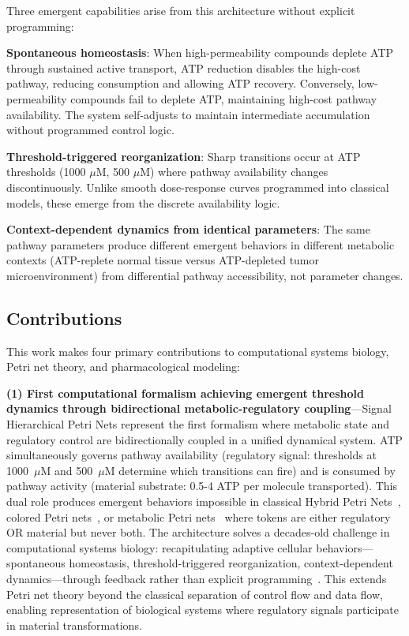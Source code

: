 \documentclass[10pt,letterpaper]{article}
\begin{document}
Three emergent capabilities arise from this architecture without explicit programming:

\textbf{Spontaneous homeostasis}: When high-permeability compounds deplete ATP through sustained active transport, ATP reduction disables the high-cost pathway, reducing consumption and allowing ATP recovery. Conversely, low-permeability compounds fail to deplete ATP, maintaining high-cost pathway availability. The system self-adjusts to maintain intermediate accumulation without programmed control logic.

\textbf{Threshold-triggered reorganization}: Sharp transitions occur at ATP thresholds (1000 $\mu$M, 500 $\mu$M) where pathway availability changes discontinuously. Unlike smooth dose-response curves programmed into classical models, these emerge from the discrete availability logic.

\textbf{Context-dependent dynamics from identical parameters}: The same pathway parameters produce different emergent behaviors in different metabolic contexts (ATP-replete normal tissue versus ATP-depleted tumor microenvironment) from differential pathway accessibility, not parameter changes.

\subsection{Contributions}

This work makes four primary contributions to computational systems biology, Petri net theory, and pharmacological modeling:

\textbf{(1) First computational formalism achieving emergent threshold dynamics through bidirectional metabolic-regulatory coupling}---Signal Hierarchical Petri Nets represent the first formalism where metabolic state and regulatory control are bidirectionally coupled in a unified dynamical system. ATP simultaneously governs pathway availability (regulatory signal: thresholds at 1000~$\mu$M and 500~$\mu$M determine which transitions can fire) and is consumed by pathway activity (material substrate: 0.5-4 ATP per molecule transported). This dual role produces emergent behaviors impossible in classical Hybrid Petri Nets~\cite{David1992}, colored Petri nets~\cite{Jensen1997}, or metabolic Petri nets~\cite{Koch2011} where tokens are either regulatory OR material but never both. The architecture solves a decades-old challenge in computational systems biology: recapitulating adaptive cellular behaviors—spontaneous homeostasis, threshold-triggered reorganization, context-dependent dynamics—through feedback rather than explicit programming~\cite{Kitano2002,Karr2012}. This extends Petri net theory beyond the classical separation of control flow and data flow, enabling representation of biological systems where regulatory signals participate in material transformations.
\end{document}
